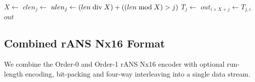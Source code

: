 \documentclass[a4paper]{article}
\begin{document}


\vskip 0.5cm

\begin{algorithmic}[1]
  \State $X \gets $
   
    \State $clen_j \gets $
  \EndFor
  \Statex
   
    \State $ulen_j \gets (len \bdiv X) + ((len \bmod X) > j)$
    \State $T_j \gets $
  \EndFor
  \Statex
   
      \State $out_{i \times X + j} \gets T_{j,i}$
    \EndFor
  \EndFor
  \State \Return $out$
\EndFunction
\end{algorithmic}

\subsection{Combined rANS Nx16 Format}

We combine the Order-0 and Order-1 rANS Nx16 encoder with optional
run-length encoding, bit-packing and four-way interleaving into a
single data stream.

%
%
\end{document}

